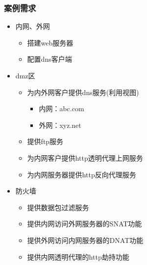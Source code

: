 \documentclass[xcolor=svgnames,presentation]{beamer}
\begin{document}
\begin{frame}
\frametitle{案例需求}
\label{sec-5-2}
\begin{itemize}

\item 内网、外网
\label{sec-5-2-1}%
\begin{itemize}

\item 搭建web服务器
\label{sec-5-2-1-1}%

\item 配置dns客户端
\label{sec-5-2-1-2}%
\end{itemize} %

\item dmz区
\label{sec-5-2-2}%
\begin{itemize}

\item 为内外网客户提供dns服务(利用视图)
\label{sec-5-2-2-1}%
\begin{itemize}

\item 内网：abc.com
\label{sec-5-2-2-1-1}%

\item 外网：xyz.net
\label{sec-5-2-2-1-2}%
\end{itemize} %

\item 提供ftp服务
\label{sec-5-2-2-2}%

\item 为内网客户提供http透明代理上网服务
\label{sec-5-2-2-3}%

\item 为内网服务器提供http反向代理服务
\label{sec-5-2-2-4}%
\end{itemize} %

\item 防火墙
\label{sec-5-2-3}%
\begin{itemize}

\item 提供数据包过滤服务
\label{sec-5-2-3-1}%

\item 提供内网访问外网服务器的SNAT功能
\label{sec-5-2-3-2}%

\item 提供外网访问内网服务器的DNAT功能
\label{sec-5-2-3-3}%

\item 提供内网透明代理的http劫持功能
\label{sec-5-2-3-4}%
\end{itemize} %
\end{itemize} %
\end{frame}
\end{document}
